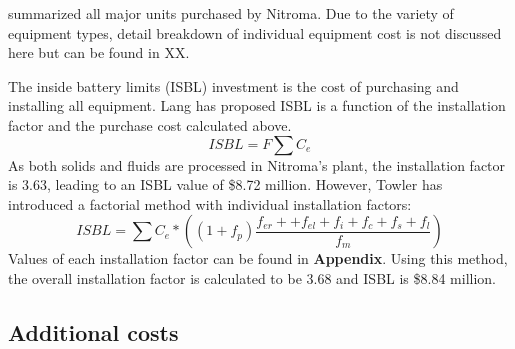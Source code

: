  summarized all major units purchased by Nitroma. Due to the variety of equipment types, detail breakdown of individual equipment cost is not discussed here but can be found in XX.

The inside battery limits (ISBL) investment is the cost of purchasing and installing all equipment. Lang has proposed ISBL is a function of the installation factor and the purchase cost calculated above.
\begin{equation}
    ISBL=F\sum C_{e}    
\end{equation}
As both solids and fluids are processed in Nitroma's plant, the installation factor is 3.63, leading to an ISBL value of \$8.72 million. However, Towler \cite{sinnott_chemical_2020} has introduced a factorial method with individual installation factors:
\begin{equation}
    ISBL=\sum C_{e}*\left(\left(1+f_{p}\right)\frac{f_{er}++f_{el}+f_{i}+f_{c}+f_{s}+f_{l}}{f_{m}}\right)
\end{equation}
Values of each installation factor can be found in \textbf{Appendix}. Using this method, the overall installation factor is calculated to be 3.68 and ISBL is \$8.84 million.

\subsection{Additional costs}

